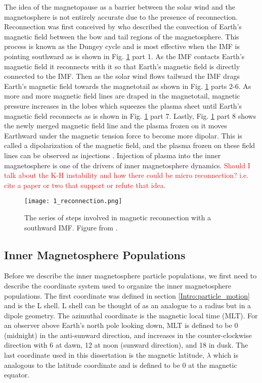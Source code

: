 The idea of the magnetopause as a barrier between the solar wind and the magnetosphere is not entirely accurate due to the presence of reconnection. Reconnection was first conceived by \citet{Dungey1961} who described the convection of Earth's magnetic field between the bow and tail regions of the magnetosphere. This process is known as the Dungey cycle and is most effective when the IMF is pointing southward as is shown in Fig. \ref{Intro:reconnection} part 1. As the IMF contacts Earth's magnetic field it reconnects with it so that Earth's magnetic field is directly connected to the IMF. Then as the solar wind flows tailward the IMF drags Earth's magnetic field towards the magnetotail as shown in Fig. \ref{Intro:reconnection} parts 2-6. As more and more magnetic field lines are draped in the magnetotail, magnetic pressure increases in the lobes which squeezes the plasma sheet until Earth's magnetic field reconnects as is shown in Fig. \ref{Intro:reconnection} part 7. Lastly, Fig. \ref{Intro:reconnection} part 8 shows the newly merged magnetic field line and the plasma frozen on it moves Earthward under the magnetic tension force to become more dipolar. This is called a dipolarization of the magnetic field, and the plasma frozen on these field lines can be observed as injections \citep[e.g.][]{Turner2015}. Injection of plasma into the inner magnetosphere is one of the drivers of inner magnetosphere dynamics. \textcolor{red}{Should I talk about the K-H instability and how there could be micro reconnection? i.e. cite a paper or two that support or refute that idea.}

\begin{figure}
\texttt{[image: 1\_reconnection.png]}
\caption{The series of steps involved in magnetic reconnection with a southward IMF. Figure from \citet{Baumjohann1997}.}
\label{Intro:reconnection}
\end{figure}

\subsection{Inner Magnetosphere Populations}\label{Intro:inner_mag}
Before we describe the inner magnetosphere particle populations, we first need to describe the coordinate system used to organize the inner magnetosphere populations. The first coordinate was defined in section \ref{Intro:particle_motion} and is the L shell. L shell can be thought of as an analogue to a radius but in a dipole geometry. The azimuthal coordinate is the magnetic local time (MLT). For an observer above Earth's north pole looking down, MLT is defined to be 0 (midnight) in the anti-sunward direction, and increases in the counter-clockwise direction with 6 at dawn, 12 at noon (sunward direction), and 18 in dusk. The last coordinate used in this dissertation is the magnetic latitude, $\lambda$ which is analogous to the latitude coordinate and is defined to be 0 at the magnetic equator. 

